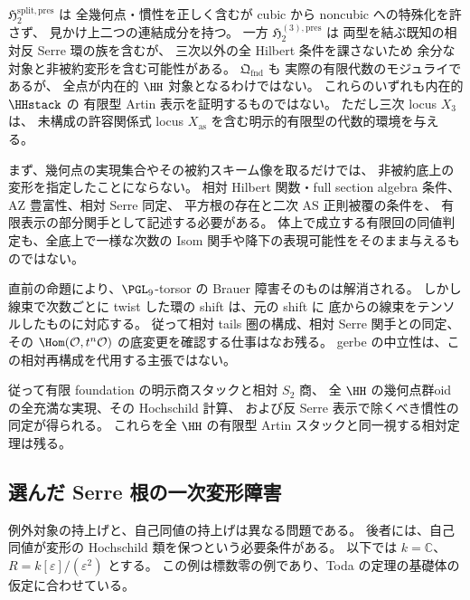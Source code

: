 \begin{remark}
$\mathfrak H_2^{\mathrm{split,pres}}$ は
全幾何点・慣性を正しく含むが
cubic から noncubic への特殊化を許さず、
見かけ上二つの連結成分を持つ。
一方 $\mathfrak H_2^{(3),\mathrm{pres}}$ は
両型を結ぶ既知の相対反 Serre 環の族を含むが、
三次以外の全 Hilbert 条件を課さないため
余分な対象と非被約変形を含む可能性がある。
$\mathfrak Q_{\mathrm{fnd}}$ も
実際の有限代数のモジュライであるが、
全点が内在的 $\HH$ 対象となるわけではない。
これらのいずれも内在的 $\HHstack$ の
有限型 Artin 表示を証明するものではない。
ただし三次 locus $X_3$ は、
未構成の許容関係式 locus $X_{\mathrm{as}}$
を含む明示的有限型の代数的環境を与える。
\end{remark}

\begin{remark}
まず、幾何点の実現集合やその被約スキーム像を取るだけでは、
非被約底上の変形を指定したことにならない。
相対 Hilbert 関数・full section algebra 条件、AZ 豊富性、相対 Serre 同定、
平方根の存在と二次 AS 正則被覆の条件を、
有限表示の部分関手として記述する必要がある。
体上で成立する有限回の同値判定も、全底上で一様な次数の
Isom 関手や降下の表現可能性をそのまま与えるものではない。

直前の命題により、$\PGL_9$-torsor の Brauer 障害そのものは解消される。
しかし線束で次数ごとに twist した環の shift は、元の shift に
底からの線束をテンソルしたものに対応する。
従って相対 tails 圏の構成、相対 Serre 関手との同定、
その $\Hom(\mathcal O,t^n\mathcal O)$ の底変更を確認する仕事はなお残る。
gerbe の中立性は、この相対再構成を代用する主張ではない。

従って有限 foundation の明示商スタックと相対 $S_2$ 商、
全 $\HH$ の幾何点群oidの全充満な実現、その Hochschild 計算、
および反 Serre 表示で除くべき慣性の同定が得られる。
これらを全 $\HH$ の有限型 Artin スタックと同一視する相対定理は残る。
\end{remark}

\subsection{選んだ Serre 根の一次変形障害}
\label{subsec:chosen-root-deformation-obstruction}

例外対象の持上げと、自己同値の持上げは異なる問題である。
後者には、自己同値が変形の Hochschild 類を保つという必要条件がある。
以下では $k=\mathbb C$、$R=k[\varepsilon]/(\varepsilon^2)$ とする。
この例は標数零の例であり、Toda の定理の基礎体の仮定に合わせている。

